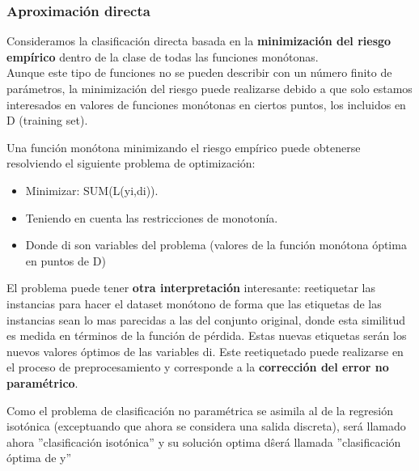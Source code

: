 \subsubsection{Aproximación directa}

Consideramos la clasificación directa basada en la\textbf{ minimización del riesgo 
empírico} dentro de la clase de todas las funciones monótonas.\\
Aunque este tipo de funciones no se pueden describir con un número 
finito de parámetros, la minimización del riesgo puede realizarse debido a 
que solo estamos interesados en valores de funciones monótonas en ciertos
puntos, los incluidos en D (training set).

Una función monótona minimizando el riesgo empírico puede obtenerse resolviendo
el siguiente problema de optimización:

\begin{itemize}
	\item Minimizar: SUM(L(yi,di)).
	\item Teniendo en cuenta las restricciones de monotonía.
	\item Donde di son variables del problema (valores de la función monótona óptima
	en puntos de D)
\end{itemize}

El problema puede tener \textbf{otra interpretación} interesante: reetiquetar las
instancias para hacer el dataset monótono de forma que las etiquetas de las
instancias sean lo mas parecidas a las del conjunto original, donde esta 
similitud es medida en términos de la función de pérdida. Estas nuevas
etiquetas serán los nuevos valores óptimos de las variables di. 
Este reetiquetado puede realizarse en el proceso de preprocesamiento
y corresponde a la \textbf{corrección del error no paramétrico}.

Como el problema de clasificación no paramétrica se asimila al de la regresión
isotónica (exceptuando que ahora se considera una salida discreta), será llamado
ahora ''clasificación isotónica'' y su solución optima d\^ será llamada
''clasificación óptima de y''




\newpage

